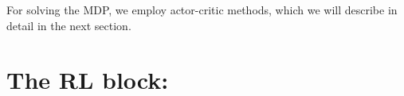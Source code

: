 For solving the MDP, we employ actor-critic methods, which we will describe in detail in the next section.


\section*{The RL block:}

